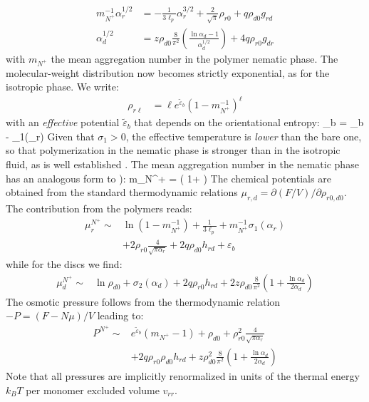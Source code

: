 \begin{align}
      m_{N^{+}}^{-1} \alpha_{r}^{1/2}  &= - \frac{1}{3\ell_{p}} \alpha_{r}^{3/2} + \frac{2}{\sqrt{\pi}}  \rho_{r0} + q \rho_{d0}  g_{rd} \nonumber \\
         \alpha_{d}^{1/2} &=  z \rho_{d0} \frac{8}{\pi^{2}}\left (  \frac{ \ln \alpha_{d} -1}{\alpha_{d}^{1/2}} \right ) 
  + 4 q \rho_{r0} g_{dr} 
  \label{alphaplus}
\end{align}
with $m_{N^{+}}$ the mean aggregation number in the polymer nematic phase.
The  molecular-weight distribution  now becomes strictly exponential, as for the isotropic phase. We write:
\begin{align}
\rho_{r \ell } & = \ell e^{ \tilde{\varepsilon}_{b}} \left ( 1 - m_{N^{+}}^{-1} \right ) ^{\ell} \label{disn}
\end{align}
with an {\em effective} potential $\tilde{\varepsilon}_{b}$ that depends on the orientational entropy:
\beq
\tilde{\varepsilon}_{b} = \varepsilon_{b} - \sigma_{1}(\alpha_{r}) 
\label{tempnplus}
\eeq
Given that $\sigma_{1} >0$, the effective temperature is {\em lower} than the bare one, so that polymerization in the nematic phase is stronger than in the isotropic fluid, as is well established \cite{vdschoot1994epl,vdschoot1994la}. The mean aggregation number in the nematic phase  has an analogous form to ):
\beq
m_{N^{+}}  =  \left ( 1+ \right ) 
\eeq
The chemical potentials are obtained from the standard thermodynamic relations $\mu_{r,d}  = \partial (F/V) /\partial \rho_{r0,d0}$. The contribution from the polymers reads:
\begin{align}
\mu_{r}^{N^{+}}  \sim & \ln ( 1 - m_{N^{+}}^{-1}) + \frac{1}{3 \ell_{p}}  +  m_{N^{+}}^{-1} \sigma_{1}(\alpha_{r})  \nonumber \\
& + 2  \rho_{r0}   \frac{4}{\sqrt{\pi \alpha_{r}}}  +   2 q \rho_{d0} h_{rd}
+ \varepsilon_{b} 
\end{align}
while for the discs we find:
\begin{align}
\mu_{d}^{N^{+}}  \sim  & \ln \rho_{d0}  + \sigma_{2}(\alpha_{d})  +   2 q \rho_{r0}  
h_{rd} + 2 z \rho_{d0} 
\frac{8}{\pi^{2}} \left ( 1+ \frac{\ln \alpha_{d}}{2 \alpha_{d}} \right )
\end{align}
The osmotic pressure follows from  the thermodynamic relation $-P = (F - N \mu)/V$ leading to:
\begin{align}
P^{N^{+}} \sim & e^{\tilde{\varepsilon}_{b}} (m_{N^{+}} -1) 
+ \rho_{d0}  +  \rho_{r0}^{2}  \frac{4}{\sqrt{\pi \alpha_{r}}}
 \nonumber \\ 
& +   2 q \rho_{r0}  \rho_{d0} h_{rd}
 + z \rho_{d0}^{2} 
  \frac{8}{\pi^{2}} \left ( 1+ \frac{\ln \alpha_{d}}{2 \alpha_{d}}   \right )
\label{pressurenp}
\end{align}
Note that all pressures are implicitly renormalized in units of the thermal energy $k_{B}T$ per monomer excluded volume  $v_{rr}$.


